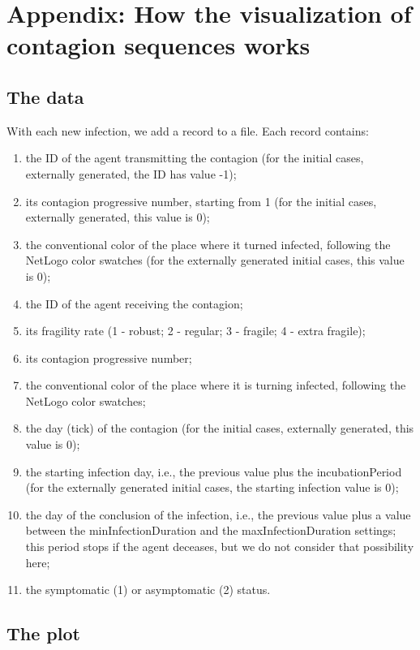 \documentclass[11pt]{article}
\begin{document}
\section{Appendix: How the visualization of contagion sequences works}
\label{appHowItWorks}

\subsection{The data}

With each new infection, we add a record to a file. Each record contains:
\begin{enumerate}\addtocounter{enumi}{-1}
\setlength{\itemsep}{0pt}
\item the ID of the agent transmitting the contagion (for the initial cases, externally generated, the ID has value -1);
\item its contagion progressive number, starting from 1 (for the initial cases, externally generated, this value is 0);
\item the conventional color of the place where it turned infected, following the NetLogo color swatches (for the externally generated initial cases, this value is 0);
\item the ID of the agent receiving the contagion;
\item its fragility rate (1 - robust; 2 - regular; 3 - fragile; 4 - extra fragile);
\item its contagion progressive number;
\item the conventional color of the place where it is turning infected, following the NetLogo color swatches;
\item the day (tick) of the contagion (for the initial cases, externally generated, this value is 0);
\item the starting infection day, i.e., the previous value plus the incubationPeriod (for the externally generated initial cases, the starting infection value is 0);
\item the day of the conclusion of the infection, i.e., the previous value plus a value between the minInfectionDuration and the maxInfectionDuration settings; this period stops if the agent deceases, but we do not consider that possibility here;
\item the symptomatic (1) or asymptomatic (2) status.
\end{enumerate}

\subsection{The plot}
\label{lineStyle}
\end{document}
